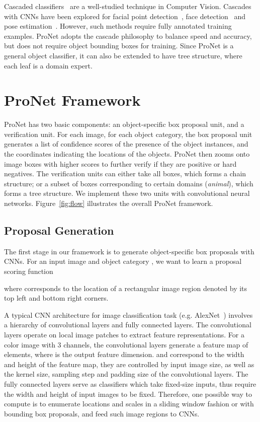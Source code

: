\documentclass[10pt,twocolumn,letterpaper]{article}
\begin{document}
Cascaded classifiers~\cite{DBLP:conf/cvpr/ViolaJ01} are a well-studied technique in Computer Vision. Cascades with CNNs have been explored for facial point detection~\cite{DBLP:conf/cvpr/SunWT13}, face detection~\cite{DBLP:conf/cvpr/LiLSBH15} and pose estimation~\cite{DBLP:journals/corr/ToshevS13}. However, such methods require fully annotated training examples. ProNet adopts the cascade philosophy to balance speed and accuracy, but does not require object bounding boxes for training. Since ProNet is a general object classifier, it can also be extended to have tree structure, where each leaf is a domain expert.

\section{ProNet Framework}

ProNet has two basic components: an object-specific box proposal unit, and a verification unit. For each image, for each object category, the box proposal unit generates a list of confidence scores of the presence of the object instances, and the  coordinates indicating the locations of the objects. ProNet then zooms onto image boxes with higher scores to further verify if they are positive or hard negatives. The verification units can either take all boxes, which forms a chain structure; or a subset of boxes corresponding to certain domains (\eg \textit{animal}), which forms a tree structure. We implement these two units with convolutional neural networks. Figure~\ref{fig:flow} illustrates the overall ProNet framework.





\subsection{Proposal Generation}
The first stage in our framework is to generate object-specific box proposals with CNNs. For an input image  and object category , we want to learn a proposal scoring function

where  corresponds to the location of a rectangular image region denoted by its top left and bottom right corners.

A typical CNN architecture for image classification task (e.g. AlexNet~\cite{NIPS2012_4824}) involves a hierarchy of convolutional layers and fully connected layers. The convolutional layers operate on local image patches to extract feature representations. For a  color image with 3 channels, the convolutional layers generate a feature map of  elements, where  is the output feature dimension.  and  correspond to the width and height of the feature map, they are controlled by input image size, as well as the kernel size, sampling step and padding size of the convolutional layers. The fully connected layers serve as classifiers which take fixed-size inputs, thus require the width and height of input images to be fixed. Therefore, one possible way to compute  is to enumerate locations and scales in a sliding window fashion or with bounding box proposals, and feed such image regions to CNNs.
\end{document}
